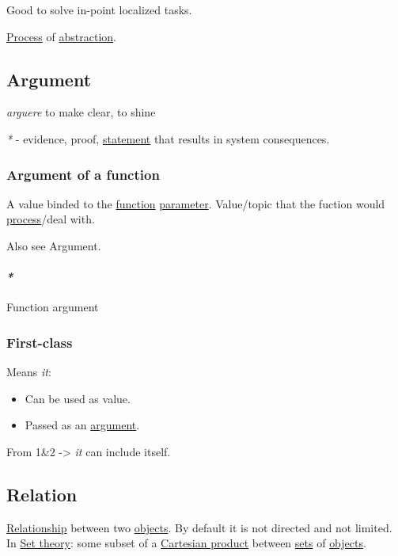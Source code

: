 \documentclass[a4paper,14pt,oneside]{book}
\begin{document}
Good to solve in-point localized tasks.

\hyperref[org4a79554]{Process} of \hyperref[orgfa1b674]{abstraction}.

\subsection{\label{org4072c80}Argument}
\label{sec:org5949444}
\emph{arguere} to make clear, to shine

\emph{*} - evidence, proof, \hyperref[orgb155ff3]{statement} that results in system consequences.

\subsubsection{\label{org71654a6}Argument of a function}
\label{sec:org368b374}
A value binded to the \hyperref[org679af45]{function} \hyperref[orgae9d304]{parameter}. Value/topic that the fuction would \hyperref[org4a79554]{process}/deal with.

Also see \label{orgf9fd1c6}Argument.

\paragraph{\emph{*}}
\label{sec:orgc13966c}

\label{orga61ba16}Function argument

\subsubsection{\label{orgb45aa2c}First-class}
\label{sec:org748f612}
Means \emph{it}:
\begin{itemize}
\item Can be used as value.
\item Passed as an \hyperref[org4072c80]{argument}.
\end{itemize}
From 1\&2 -> \emph{it} can include itself.

\subsection{\label{org36115b6}Relation}
\label{sec:org11d9c9b}
\hyperref[orgd102818]{Relationship} between two \hyperref[orgde02dc0]{objects}.
By default it is not directed and not limited.
In \hyperref[org26a16e8]{Set theory}: some subset of a \hyperref[orgaccf8ee]{Cartesian product} between \hyperref[orgfcb3af7]{sets} of \hyperref[orgde02dc0]{objects}.
\end{document}

